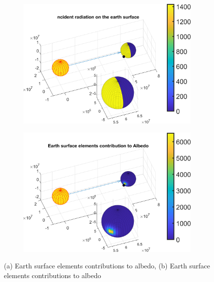 \documentclass[11pt]{article}
\begin{document}
 
\begin{figure}[h]
    \centering
    \begin{subfigure}[b]{0.48\textwidth}
        \includegraphics[width=\textwidth]{Matlab/images/inc_sun_rad.png}
        \caption{}
        \label{fig:solar-rad-on-earth}
    \end{subfigure}
    \begin{subfigure}[b]{0.48\textwidth}
        \includegraphics[width=\textwidth]{Matlab/images/albedo_elements.png}
        \caption{}
        \label{fig:albedo}
    \end{subfigure}
    \caption{(a) Earth surface elements contributions to albedo, (b) Earth surface elements contributions to albedo}
\end{figure}
\end{document}
